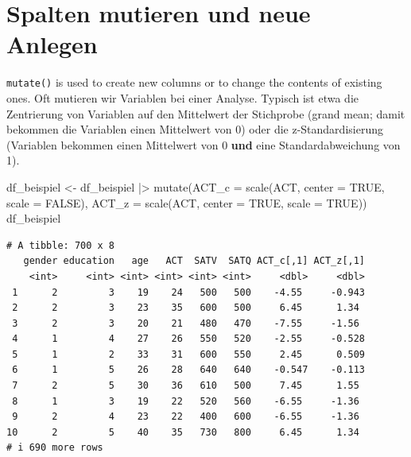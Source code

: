 \documentclass[
  letterpaper,
  DIV=11,
  numbers=noendperiod]{scrreprt}
\newenvironment{Shaded}{\begin{snugshade}}{\end{snugshade}}
\newcommand{\AttributeTok}[1]{\textcolor[rgb]{0.40,0.45,0.13}{#1}}
\newcommand{\ConstantTok}[1]{\textcolor[rgb]{0.56,0.35,0.01}{#1}}
\newcommand{\FunctionTok}[1]{\textcolor[rgb]{0.28,0.35,0.67}{#1}}
\newcommand{\NormalTok}[1]{\textcolor[rgb]{0.00,0.23,0.31}{#1}}
\newcommand{\OtherTok}[1]{\textcolor[rgb]{0.00,0.23,0.31}{#1}}
\newcommand{\SpecialCharTok}[1]{\textcolor[rgb]{0.37,0.37,0.37}{#1}}
\begin{document}

\chapter{Spalten mutieren und neue
Anlegen}\label{spalten-mutieren-und-neue-anlegen}

\texttt{mutate()} is used to create new columns or to change the
contents of existing ones. Oft mutieren wir Variablen bei einer Analyse.
Typisch ist etwa die Zentrierung von Variablen auf den Mittelwert der
Stichprobe (grand mean; damit bekommen die Variablen einen Mittelwert
von 0) oder die z-Standardisierung (Variablen bekommen einen Mittelwert
von 0 \textbf{und} eine Standardabweichung von 1).

\begin{Shaded}
\begin{Highlighting}[]
\NormalTok{df\_beispiel }\OtherTok{\textless{}{-}}\NormalTok{ df\_beispiel }\SpecialCharTok{|\textgreater{}} \FunctionTok{mutate}\NormalTok{(}\AttributeTok{ACT\_c =} \FunctionTok{scale}\NormalTok{(ACT, }\AttributeTok{center =} \ConstantTok{TRUE}\NormalTok{, }\AttributeTok{scale =} \ConstantTok{FALSE}\NormalTok{),}
                                     \AttributeTok{ACT\_z =} \FunctionTok{scale}\NormalTok{(ACT, }\AttributeTok{center =} \ConstantTok{TRUE}\NormalTok{, }\AttributeTok{scale =} \ConstantTok{TRUE}\NormalTok{))}
\NormalTok{df\_beispiel}
\end{Highlighting}
\end{Shaded}

\begin{verbatim}
# A tibble: 700 x 8
   gender education   age   ACT  SATV  SATQ ACT_c[,1] ACT_z[,1]
    <int>     <int> <int> <int> <int> <int>     <dbl>     <dbl>
 1      2         3    19    24   500   500    -4.55     -0.943
 2      2         3    23    35   600   500     6.45      1.34 
 3      2         3    20    21   480   470    -7.55     -1.56 
 4      1         4    27    26   550   520    -2.55     -0.528
 5      1         2    33    31   600   550     2.45      0.509
 6      1         5    26    28   640   640    -0.547    -0.113
 7      2         5    30    36   610   500     7.45      1.55 
 8      1         3    19    22   520   560    -6.55     -1.36 
 9      2         4    23    22   400   600    -6.55     -1.36 
10      2         5    40    35   730   800     6.45      1.34 
# i 690 more rows
\end{verbatim}

\end{document}
